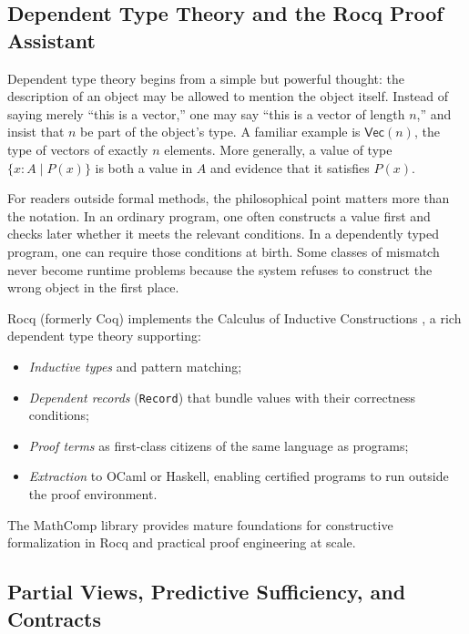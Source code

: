 \documentclass[12pt, a4paper]{article}
\begin{document}
\subsection{Dependent Type Theory and the Rocq Proof Assistant}

Dependent type theory \citep{martin-lof1984, coquand1988calculus} begins from a
simple but powerful thought: the description of an object may be allowed to
mention the object itself. Instead of saying merely ``this is a vector,'' one
may say ``this is a vector of length $n$,'' and insist that $n$ be part of the
object's type. A familiar example is $\mathsf{Vec}(n)$, the type of vectors of
exactly $n$ elements. More generally, a value of type $\{x : A \mid P(x)\}$ is
both a value in $A$ and evidence that it satisfies $P(x)$.

For readers outside formal methods, the philosophical point matters more than
the notation. In an ordinary program, one often constructs a value first and
checks later whether it meets the relevant conditions. In a dependently typed
program, one can require those conditions at birth. Some classes of mismatch
never become runtime problems because the system refuses to construct the wrong
object in the first place.

Rocq (formerly Coq) \citep{coq2024} implements the Calculus of Inductive
Constructions \citep{coquand1988calculus, paulin-mohring2015}, a rich
dependent type theory supporting:
\begin{itemize}
  \item \emph{Inductive types} and pattern matching;
  \item \emph{Dependent records} (\texttt{Record}) that bundle values with
    their correctness conditions;
  \item \emph{Proof terms} as first-class citizens of the same language as
    programs;
  \item \emph{Extraction} to OCaml or Haskell, enabling certified programs to
    run outside the proof environment.
\end{itemize}

The MathComp library \citep{gonthier2013odd} provides mature foundations for
constructive formalization in Rocq and practical proof engineering at scale.

\subsection{Partial Views, Predictive Sufficiency, and Contracts}
\end{document}
